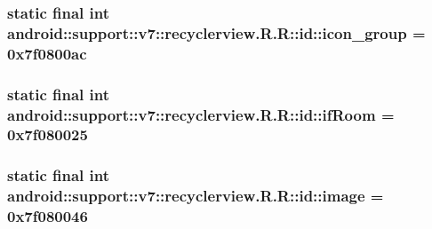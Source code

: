\hypertarget{classandroid_1_1support_1_1v7_1_1recyclerview_1_1_r_1_1id_23cf7fbfb3c348da13ba7d8ed6febcfd}{
\subsubsection[{icon\_\-group}]{\setlength{\rightskip}{0pt plus 5cm}static final int android::support::v7::recyclerview.R.R::id::icon\_\-group = 0x7f0800ac}}
\label{classandroid_1_1support_1_1v7_1_1recyclerview_1_1_r_1_1id_23cf7fbfb3c348da13ba7d8ed6febcfd}


\hypertarget{classandroid_1_1support_1_1v7_1_1recyclerview_1_1_r_1_1id_cbebd59f11ff839b075826831b27b1a0}{
\subsubsection[{ifRoom}]{\setlength{\rightskip}{0pt plus 5cm}static final int android::support::v7::recyclerview.R.R::id::ifRoom = 0x7f080025}}
\label{classandroid_1_1support_1_1v7_1_1recyclerview_1_1_r_1_1id_cbebd59f11ff839b075826831b27b1a0}


\hypertarget{classandroid_1_1support_1_1v7_1_1recyclerview_1_1_r_1_1id_abcf6c442f4aa481ddc4e761c516eef8}{
\subsubsection[{image}]{\setlength{\rightskip}{0pt plus 5cm}static final int android::support::v7::recyclerview.R.R::id::image = 0x7f080046}}
\label{classandroid_1_1support_1_1v7_1_1recyclerview_1_1_r_1_1id_abcf6c442f4aa481ddc4e761c516eef8}


